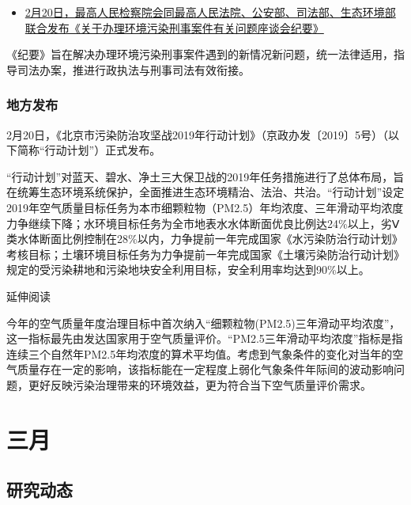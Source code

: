 \documentclass[]{book}
\providecommand{\tightlist}{%
  \setlength{\itemsep}{0pt}\setlength{\parskip}{0pt}}
\begin{document}
\begin{itemize}
\tightlist
\item
  \href{http://www.spp.gov.cn/spp/zdgz/201902/t20190220_408574.shtml}{2月20日，最高人民检察院会同最高人民法院、公安部、司法部、生态环境部联合发布《关于办理环境污染刑事案件有关问题座谈会纪要》}
\end{itemize}

《纪要》旨在解决办理环境污染刑事案件遇到的新情况新问题，统一法律适用，指导司法办案，推进行政执法与刑事司法有效衔接。

\hypertarget{ux5730ux65b9ux53d1ux5e03}{%
\subsubsection*{地方发布}\label{ux5730ux65b9ux53d1ux5e03}}

2月20日，《北京市污染防治攻坚战2019年行动计划》（京政办发〔2019〕5号）（以下简称``行动计划''）正式发布。

``行动计划''对蓝天、碧水、净土三大保卫战的2019年任务措施进行了总体布局，旨在统筹生态环境系统保护，全面推进生态环境精治、法治、共治。``行动计划''设定2019年空气质量目标任务为本市细颗粒物（PM2.5）年均浓度、三年滑动平均浓度力争继续下降；水环境目标任务为全市地表水水体断面优良比例达24\%以上，劣Ⅴ类水体断面比例控制在28\%以内，力争提前一年完成国家《水污染防治行动计划》考核目标；土壤环境目标任务为力争提前一年完成国家《土壤污染防治行动计划》规定的受污染耕地和污染地块安全利用目标，安全利用率均达到90\%以上。

延伸阅读

今年的空气质量年度治理目标中首次纳入``细颗粒物(PM2.5)三年滑动平均浓度''，这一指标最先由发达国家用于空气质量评价。``PM2.5三年滑动平均浓度''指标是指连续三个自然年PM2.5年均浓度的算术平均值。考虑到气象条件的变化对当年的空气质量存在一定的影响，该指标能在一定程度上弱化气象条件年际间的波动影响问题，更好反映污染治理带来的环境效益，更为符合当下空气质量评价需求。

\hypertarget{ux4e09ux6708-1}{%
\section*{三月}\label{ux4e09ux6708-1}}

\hypertarget{ux7814ux7a76ux52a8ux6001-16}{%
\subsection*{研究动态}\label{ux7814ux7a76ux52a8ux6001-16}}
\end{document}

